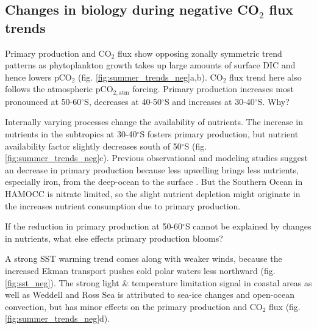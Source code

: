 \clearpage

\subsection{Changes in biology during negative CO$_2$ flux trends}
\label{sec:trends_neg_biology}


  
Primary production and CO$_2$ flux show opposing zonally symmetric trend patterns as phytoplankton growth takes up large amounts of surface \acs{DIC} and hence lowers pCO$_2$ (fig. \ref{fig:summer_trends_neg}a,b). CO$_2$ flux trend here also follows the atmospheric pCO$_{2,\text{atm}}$ forcing. Primary production increases most pronounced at 50-60$^\circ$S, decreases at 40-50$^\circ$S and increases at 30-40$^\circ$S. Why?

Internally varying processes change the availability of nutrients. 
The increase in nutrients in the subtropics at 30-40$^\circ$S fosters primary production, but nutrient availability factor slightly decreases south of 50$^\circ$S (fig. \ref{fig:summer_trends_neg}c). 
Previous observational and modeling studies suggest an decrease in primary production because less upwelling brings less nutrients, especially iron, from the deep-ocean to the surface \citep{Tagliabue2014}. But the Southern Ocean in \acs{HAMOCC} is nitrate limited, so the slight nutrient depletion might originate in the increases nutrient consumption due to primary production.  \newline

If the reduction in primary production at 50-60$^\circ$S cannot be explained by changes in nutrients, what else effects primary production blooms?

A strong \acs{SST} warming trend comes along with weaker winds, because the increased Ekman transport pushes cold polar waters less northward (fig. \ref{fig:sst_neg}). The strong light \& temperature limitation signal in coastal areas as well as Weddell and Ross Sea is attributed to sea-ice changes and open-ocean convection, but has minor effects on the primary production and CO$_2$ flux (fig. \ref{fig:summer_trends_neg}d). 


